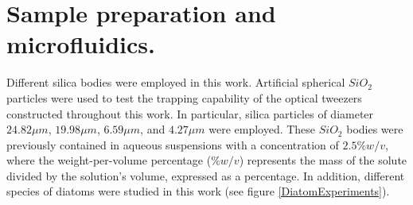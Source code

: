 \documentclass[letterpaper,12pt,oneside]{book}
\begin{document}
\section{Sample preparation and microfluidics.}
Different silica bodies were employed in this work. Artificial spherical $SiO_2$ particles were used to test the trapping capability of the optical tweezers constructed throughout this work. In particular, silica particles of diameter $24.82\mu m$, $19.98 \mu m$, $6.59 \mu m$, and $4.27 \mu m$ were employed. These $SiO_2$ bodies were previously contained in aqueous suspensions with a concentration of $2.5\% w/v$, where the weight-per-volume percentage ($\% w/v$) represents the mass of the solute divided by the solution's volume, expressed as a percentage.
In addition, different species of diatoms were studied in this work (see figure \ref{DiatomExperiments}).
\end{document}

